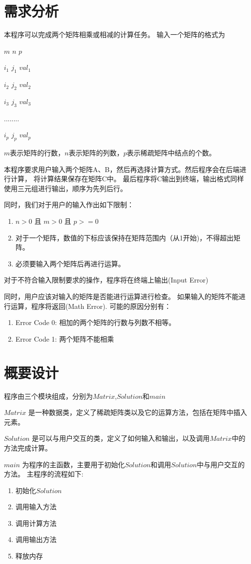 \section{需求分析}
   本程序可以完成两个矩阵相乘或相减的计算任务。
   输入一个矩阵的格式为
   
   
   $m$ $n$ $p$


   $i_1$ $j_1$ $val_1$


   $i_2$ $j_2$ $val_2$


   $i_3$ $j_3$ $val_3$


   ........


   $i_p$ $j_p$ $val_p$


   $m$表示矩阵的行数，$n$表示矩阵的列数，$p$表示稀疏矩阵中结点的个数。
   

   本程序要求用户输入两个矩阵A、B，然后再选择计算方式。然后程序会在后端进行计算，
   将计算结果保存在矩阵C中。
   最后程序将C输出到终端，输出格式同样使用三元组进行输出，顺序为先列后行。


   同时，我们对于用户的输入作出如下限制：
   \begin{enumerate}
      \item $n > 0$ 且 $m > 0$ 且 $p >= 0$
      \item 对于一个矩阵，数值的下标应该保持在矩阵范围内（从1开始)，不得超出矩阵。
      \item 必须要输入两个矩阵后再进行运算。
   \end{enumerate}
   对于不符合输入限制要求的操作，程序将在终端上输出(Input Error)


   同时，用户应该对输入的矩阵是否能进行运算进行检查。
   如果输入的矩阵不能进行运算，程序将返回(Math Error).
   可能的原因分别有：
   \begin{enumerate}
      \item Error Code 0: 相加的两个矩阵的行数与列数不相等。
      \item Error Code 1: 两个矩阵不能相乘
   \end{enumerate}
\section{概要设计}
   程序由三个模块组成，分别为$Matrix$,$Solution$和$main$

   
   $Matrix$ 是一种数据类，定义了稀疏矩阵类以及它的运算方法，包括在矩阵中插入元素。


   $Solution$ 是可以与用户交互的类，定义了如何输入和输出，以及调用$Matrix$中的方法完成计算。


   $main$ 为程序的主函数，主要用于初始化$Solution$和调用$Solution$中与用户交互的方法。
   主程序的流程如下:
   \begin{enumerate}
      \item 初始化$Solution$
      \item 调用输入方法
      \item 调用计算方法
      \item 调用输出方法
      \item 释放内存
   \end{enumerate}

